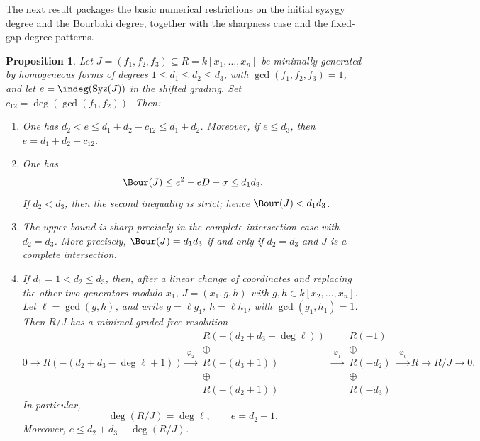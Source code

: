 \documentclass[11pt]{amsart} %
\newtheorem{Proposition}[Theorem]{Proposition}
\theoremstyle{definition}
\def\phi{\varphi}
\def\syz{\mbox{\rm Syz}}
\def\phi{\varphi}
\begin{document}
The next result packages the basic numerical restrictions on the initial syzygy degree and the Bourbaki degree, together with the sharpness case and the fixed-gap degree patterns.
\begin{Proposition}\label{prop:numerical-bounds-non-equigenerated}
Let $J=(f_1,f_2,f_3)\subseteq R=k[x_1,\ldots,x_n]$ be minimally generated by homogeneous forms of degrees $1\le d_1\le d_2\le d_3$, with $\gcd(f_1,f_2,f_3)=1$, and let $e=\indeg(\syz(J))$ in the shifted grading. Set $c_{12}=\deg(\gcd(f_1,f_2))$. Then:
\begin{enumerate}
\item[\rm(i)] One has $d_2<e\le d_1+d_2-c_{12}\le d_1+d_2$. Moreover, if $e\le d_3$, then $e=d_1+d_2-c_{12}$.

\item[\rm(ii)] One has
\[
\Bour(J)\le e^2-eD+\sigma\le d_1d_3.
\]
If $d_2<d_3$, then the second inequality is strict; hence $\Bour(J)<d_1d_3$.

\item[\rm(iii)] The upper bound is sharp precisely in the complete intersection case with $d_2=d_3$. More precisely, $\Bour(J)=d_1d_3$ if and only if $d_2=d_3$ and $J$ is a complete intersection.

\item[\rm(iv)] If $d_1=1<d_2\le d_3$, then, after a linear change of coordinates and replacing the other two generators modulo $x_1$, $J=(x_1,g,h)$ with $g,h\in k[x_2,\ldots,x_n].$
Let $\ell=\gcd(g,h)$, and write $g=\ell g_1$, $h=\ell h_1$, with $\gcd(g_1,h_1)=1$. Then $R/J$ has a minimal graded free resolution
\small{\[
0\to R(-(d_2+d_3-\deg\ell+1))
\xrightarrow{\ \phi_2\ }
\begin{matrix}
R(-(d_2+d_3-\deg\ell))\\
\oplus\\
R(-(d_3+1))\\
\oplus\\
R(-(d_2+1))
\end{matrix}
\xrightarrow{\ \phi_1\ }
\begin{matrix}
R(-1)\\
\oplus\\
R(-d_2)\\
\oplus\\
R(-d_3)
\end{matrix}
\xrightarrow{\ \phi_0\ }
R\to R/J\to0.
\]}
In particular,
\[
\deg(R/J)=\deg\ell,
\qquad
e=d_2+1.
\]
Moreover, $e\le d_2+d_3-\deg(R/J)$. 


\end{enumerate}
\end{Proposition}
\end{document}
